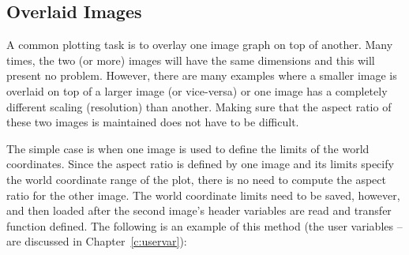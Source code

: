 \subsection*            {Overlaid Images}

A common plotting task is to overlay one image graph on top of another.
Many times, the two (or more) images will have the same dimensions and this
will present no problem.
However, there are many examples where a smaller image is overlaid on
top of a larger image (or vice-versa) or one image has a completely
different scaling (resolution) than another.
Making sure that the aspect ratio of these two images is maintained
does not have to be difficult.

The simple case is when one image is used to define the limits of the
world
coordinates.
Since the aspect ratio is defined by one image and its
limits specify the world coordinate range of the plot,
there is no need to compute the aspect ratio for the other image.
The world coordinate limits need to be saved, however,
and then loaded after the
second image's
header variables are read and transfer function defined.
The following is an example of this method
(the user variables -- are discussed in Chapter~\ref{c:uservar}):
